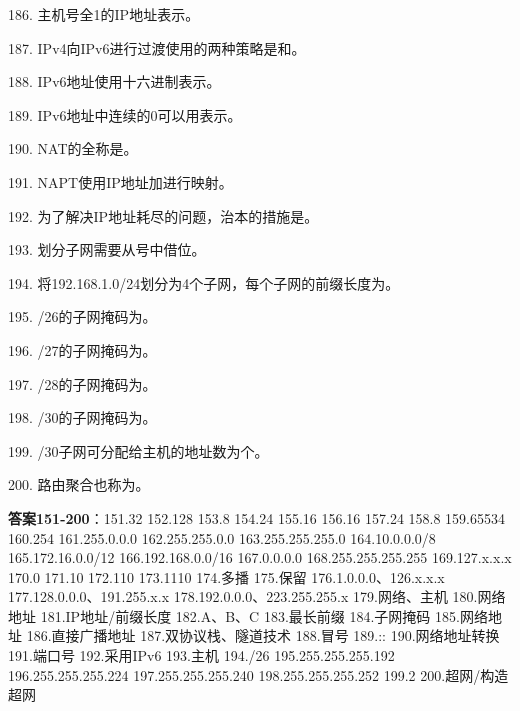 186. 主机号全1的IP地址表示\underline{\hspace{2cm}}。

187. IPv4向IPv6进行过渡使用的两种策略是\underline{\hspace{2cm}}和\underline{\hspace{2cm}}。

188. IPv6地址使用\underline{\hspace{2cm}}十六进制表示。

189. IPv6地址中连续的0可以用\underline{\hspace{2cm}}表示。

190. NAT的全称是\underline{\hspace{4cm}}。

191. NAPT使用IP地址加\underline{\hspace{2cm}}进行映射。

192. 为了解决IP地址耗尽的问题，治本的措施是\underline{\hspace{2cm}}。

193. 划分子网需要从\underline{\hspace{2cm}}号中借位。

194. 将192.168.1.0/24划分为4个子网，每个子网的前缀长度为\underline{\hspace{2cm}}。

195. /26的子网掩码为\underline{\hspace{4cm}}。

196. /27的子网掩码为\underline{\hspace{4cm}}。

197. /28的子网掩码为\underline{\hspace{4cm}}。

198. /30的子网掩码为\underline{\hspace{4cm}}。

199. /30子网可分配给主机的地址数为\underline{\hspace{2cm}}个。

200. 路由聚合也称为\underline{\hspace{2cm}}。

\textbf{答案151-200}：151.32 152.128 153.8 154.24 155.16 156.16 157.24 158.8 159.65534 160.254 161.255.0.0.0 162.255.255.0.0 163.255.255.255.0 164.10.0.0.0/8 165.172.16.0.0/12 166.192.168.0.0/16 167.0.0.0.0 168.255.255.255.255 169.127.x.x.x 170.0 171.10 172.110 173.1110 174.多播 175.保留 176.1.0.0.0、126.x.x.x 177.128.0.0.0、191.255.x.x 178.192.0.0.0、223.255.255.x 179.网络、主机 180.网络地址 181.IP地址/前缀长度 182.A、B、C 183.最长前缀 184.子网掩码 185.网络地址 186.直接广播地址 187.双协议栈、隧道技术 188.冒号 189.:: 190.网络地址转换 191.端口号 192.采用IPv6 193.主机 194./26 195.255.255.255.192 196.255.255.255.224 197.255.255.255.240 198.255.255.255.252 199.2 200.超网/构造超网


